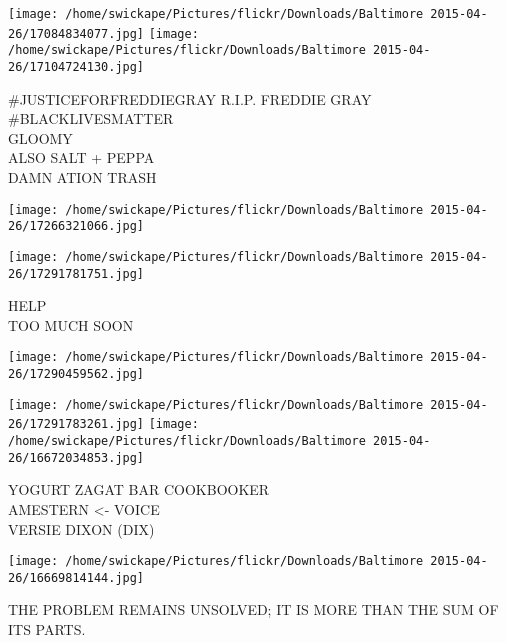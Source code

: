 \documentclass[10pt,letterpaper]{article}
\begin{document}
\texttt{[image: /home/swickape/Pictures/flickr/Downloads/Baltimore 2015-04-26/17084834077.jpg]}
\texttt{[image: /home/swickape/Pictures/flickr/Downloads/Baltimore 2015-04-26/17104724130.jpg]}

\#JUSTICEFORFREDDIEGRAY R.I.P. FREDDIE GRAY \#BLACKLIVESMATTER\\
GLOOMY\\
ALSO SALT + PEPPA\\
DAMN ATION TRASH
\pagebreak

\texttt{[image: /home/swickape/Pictures/flickr/Downloads/Baltimore 2015-04-26/17266321066.jpg]}

\vspace{0.25in}
\texttt{[image: /home/swickape/Pictures/flickr/Downloads/Baltimore 2015-04-26/17291781751.jpg]}

HELP\\
TOO MUCH SOON
\pagebreak

\texttt{[image: /home/swickape/Pictures/flickr/Downloads/Baltimore 2015-04-26/17290459562.jpg]}

\vspace{0.25in}
\texttt{[image: /home/swickape/Pictures/flickr/Downloads/Baltimore 2015-04-26/17291783261.jpg]}
\texttt{[image: /home/swickape/Pictures/flickr/Downloads/Baltimore 2015-04-26/16672034853.jpg]}

YOGURT ZAGAT BAR COOKBOOKER\\
AMESTERN <{-} VOICE\\
VERSIE DIXON (DIX)
\pagebreak

\texttt{[image: /home/swickape/Pictures/flickr/Downloads/Baltimore 2015-04-26/16669814144.jpg]}

THE PROBLEM REMAINS UNSOLVED; IT IS MORE THAN THE SUM OF ITS PARTS.
\pagebreak
\end{document}

